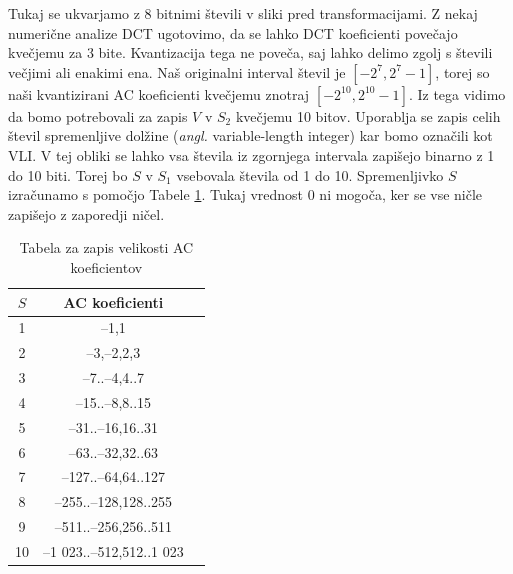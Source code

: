 \documentclass[a4paper,12pt,openright]{book}
\begin{document}
Tukaj se ukvarjamo z 8 bitnimi števili v sliki pred transformacijami. Z nekaj numerične analize DCT ugotovimo, da se lahko DCT koeficienti povečajo kvečjemu za 3 bite. Kvantizacija tega ne poveča, saj lahko delimo zgolj s števili večjimi ali enakimi ena. Naš originalni interval števil je $\left[-2^7,2^7-1\right]$, torej so naši kvantizirani AC koeficienti kvečjemu znotraj $\left[-2^{10},2^{10}-1\right]$. Iz tega vidimo da bomo potrebovali za zapis $V$ v $S_2$ kvečjemu 10 bitov. Uporablja se zapis celih števil spremenljive dolžine (\textit{angl.} variable-length integer) kar bomo označili kot VLI. V tej obliki se lahko vsa števila iz zgornjega intervala zapišejo binarno z 1 do 10 biti. Torej bo $S$ v $S_1$ vsebovala števila od 1 do 10. Spremenljivko $S$ izračunamo s pomočjo Tabele \ref{tab:Velikost_AC}. Tukaj vrednost 0 ni mogoča, ker se vse ničle zapišejo z zaporedji ničel.\par

\begin{table}[ht]
\centering
\begin{tabular}{|c|c|c|}
\hline
$S$& AC koeficienti\\
\hline
 1& –1,1\\
 2& –3,–2,2,3\\
 3& –7..–4,4..7\\
 4& –15..–8,8..15\\
 5& –31..–16,16..31\\
 6& –63..–32,32..63\\
 7& –127..–64,64..127\\
 8& –255..–128,128..255\\
 9& –511..–256,256..511\\
10& –1 023..–512,512..1 023\\
\hline
\end{tabular}
\caption{Tabela za zapis velikosti AC koeficientov}
\label{tab:Velikost_AC}
\end{table}
\end{document}
